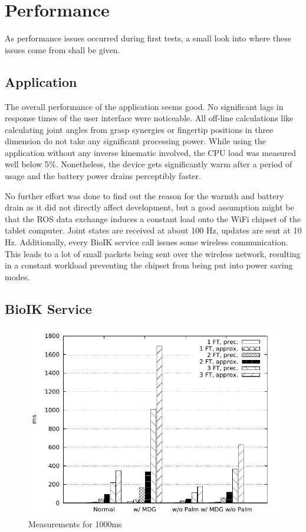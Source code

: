 \section{Performance}

As performance issues occurred during first tests, a small look into where these issues come from shall be given.

\subsection{Application}

The overall performance of the application seems good. No significant lags in response times of the user interface were noticeable. All off-line calculations like calculating joint angles from grasp synergies or fingertip positions in three dimension do not take any significant processing power. While using the application without any inverse kinematic involved, the CPU load was measured well below 5\%. Nonetheless, the device gets significantly warm after a period of usage and the battery power drains perceptibly faster. 

No further effort was done to find out the reason for the warmth and battery drain as it did not directly affect development, but a good assumption might be that the ROS data exchange induces a constant load onto the WiFi chipset of the tablet computer. Joint states are received at about 100 Hz, updates are sent at 10 Hz. Additionally, every BioIK service call issues some wireless communication. This leads to a lot of small packets being sent over the wireless network, resulting in a constant workload preventing the chipset from being put into power saving modes.

\subsection{BioIK Service}
\label{sec:eval:ikservice}

\begin{figure}
	\caption{\label{fig:eval:1000ms}Measurements for 1000ms}
	\begin{center}
		\includegraphics{assets/chpt_eval/1000ms.pdf}
	\end{center}
\end{figure}


